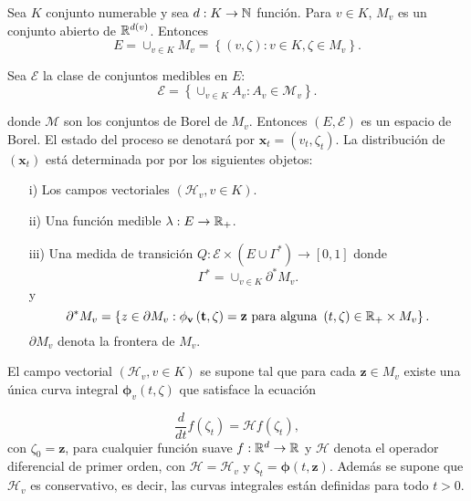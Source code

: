 Sea $K$ conjunto numerable y sea $d:K\rightarrow\mathbb{N}$ funci\'on.
Para $v\in K$, $M_{v}$ es un conjunto abierto de
$\mathbb{R}^{d\left(v\right)}$. Entonces \[E=\cup_{v\in
K}M_{v}=\left\{\left(v,\zeta\right):v\in K,\zeta\in
M_{v}\right\}.\]

Sea $\mathcal{E}$ la clase de conjuntos medibles en $E$:
\[\mathcal{E}=\left\{\cup_{v\in K}A_{v}:A_{v}\in \mathcal{M}_{v}\right\}.\]

donde $\mathcal{M}$ son los conjuntos de Borel de $M_{v}$.
Entonces $\left(E,\mathcal{E}\right)$ es un espacio de Borel. El
estado del proceso se denotar\'a por
$\mathbf{x}_{t}=\left(v_{t},\zeta_{t}\right)$. La distribuci\'on
de $\left(\mathbf{x}_{t}\right)$ est\'a determinada por por los
siguientes objetos:

\begin{itemize}
\item[i)] Los campos vectoriales $\left(\mathcal{H}_{v},v\in
K\right)$. \item[ii)] Una funci\'on medible $\lambda:E\rightarrow
\mathbb{R}_{+}$. \item[iii)] Una medida de transici\'on
$Q:\mathcal{E}\times\left(E\cup\Gamma^{*}\right)\rightarrow\left[0,1\right]$
donde
\begin{equation}
\Gamma^{*}=\cup_{v\in K}\partial^{*}M_{v}.
\end{equation}
y
\begin{equation}
\partial^{*}M_{v}=\left\{z\in\partial M_{v}:\mathbf{\mathbf{\phi}_{v}\left(t,\zeta\right)=\mathbf{z}}\textrm{ para alguna }\left(t,\zeta\right)\in\mathbb{R}_{+}\times M_{v}\right\}.
\end{equation}
$\partial M_{v}$ denota  la frontera de $M_{v}$.
\end{itemize}

El campo vectorial $\left(\mathcal{H}_{v},v\in K\right)$ se supone
tal que para cada $\mathbf{z}\in M_{v}$ existe una \'unica curva
integral $\mathbf{\phi}_{v}\left(t,\zeta\right)$ que satisface la
ecuaci\'on

\begin{equation}
\frac{d}{dt}f\left(\zeta_{t}\right)=\mathcal{H}f\left(\zeta_{t}\right),
\end{equation}
con $\zeta_{0}=\mathbf{z}$, para cualquier funci\'on suave
$f:\mathbb{R}^{d}\rightarrow\mathbb{R}$ y $\mathcal{H}$ denota el operador
diferencial de primer orden, con $\mathcal{H}=\mathcal{H}_{v}$ y
$\zeta_{t}=\mathbf{\phi}\left(t,\mathbf{z}\right)$. Adem\'as se
supone que $\mathcal{H}_{v}$ es conservativo, es decir, las curvas
integrales est\'an definidas para todo $t>0$.

